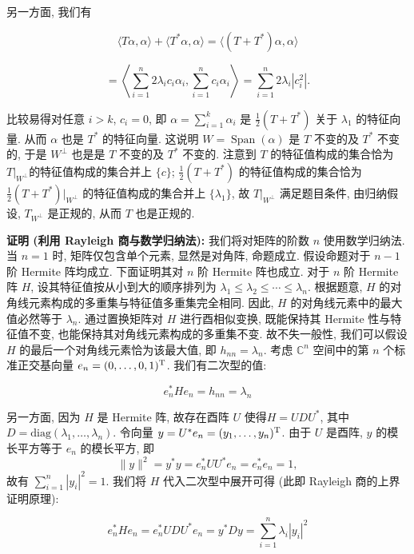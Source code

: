 \begin{enumerate}
另一方面, 我们有

\[\langle T \alpha, \alpha \rangle + \langle T ^ {*} \alpha, \alpha \rangle 
= \langle (T + T ^ {*}) \alpha, \alpha \rangle\]

\[= \left\langle \sum_{i=1}^{n} 2 \lambda_{i} c_{i} \alpha_{i}, 
\sum_{i=1}^{n} c_{i} \alpha_{i} \right\rangle 
= \sum_ {i=1}^{n} 2 \lambda_{i} |c_{i}^{2}|.\]

比较易得对任意 \(i > k\), \(c_{i} = 0\), 
即 \(\alpha = \sum_{i=1}^{k} \alpha_{i}\) 
是 \(\frac{1}{2}(T + T^{*})\) 关于 \(\lambda_{1}\) 的特征向量. 
从而 \(\alpha\) 也是 \(T^{*}\) 的特征向量. 
这说明 \(W = \operatorname{Span}(\alpha)\) 是 \(T\) 不变的及 \(T^{*}\) 不变的, 
于是 \(W^{\perp}\) 也是是 \(T\) 不变的及 \(T^{*}\) 不变的. 
注意到 \(T\) 的特征值构成的集合恰为 \(T|_{W^{\perp}}\)的特征值构成的集合并上 \(\{c\}\); 
\(\frac{1}{2}(T + T^{*})\) 的特征值构成的集合恰为 
\(\frac{1}{2}(T + T^{*})|_{W^{\perp}}\) 的特征值构成的集合并上 \(\{\lambda_{1}\}\), 
故 \(T|_{W^{\perp}}\) 满足题目条件, 
由归纳假设, \(T_{W^{\perp}}\) 是正规的, 从而 \(T\) 也是正规的.

\textbf{证明 (利用 Rayleigh 商与数学归纳法):} 
我们将对矩阵的阶数 \(n\) 使用数学归纳法. 
当 \(n = 1\) 时, 矩阵仅包含单个元素, 显然是对角阵, 命题成立. 
假设命题对于 \(n - 1\) 阶 Hermite 阵均成立. 
下面证明其对 \(n\) 阶 Hermite 阵也成立. 
对于 \(n\) 阶 Hermite 阵 \(H\), 设其特征值按从小到大的顺序排列为
\(\lambda_1 \leqslant \lambda_2 \leqslant \cdots \leqslant \lambda_n\). 
根据题意, \(H\) 的对角线元素构成的多重集与特征值多重集完全相同. 
因此, \(H\) 的对角线元素中的最大值必然等于 \(\lambda_n\). 
通过置换矩阵对 \(H\) 进行酉相似变换, 
既能保持其 Hermite 性与特征值不变, 也能保持其对角线元素构成的多重集不变. 
故不失一般性, 我们可以假设 \(H\) 的最后一个对角线元素恰为该最大值, 即 \(h_{nn} = \lambda_n\). 
考虑 \(\mathbb{C}^n\) 空间中的第 \(n\) 个标准正交基向量 \(e_n = (0, \ldots, 0, 1)^{\rm T}\). 我们有二次型的值:

\[e_{n}^{*} H e_{n} = h_{nn} = \lambda_{n}\]

另一方面, 因为 \(H\) 是 Hermite 阵, 故存在酉阵 \(U\) 使得\(H = UDU^{*}\), 
其中 \(D = \mathrm{diag}(\lambda_{1},\ldots,\lambda_{n})\). 
令向量 \(y = U^{*}e_{n} = (y_{1},\ldots,y_{n})^{\rm T}\). 
由于 \(U\) 是酉阵, \(y\) 的模长平方等于 \(e_{n}\) 的模长平方, 即
\[\| y\| ^2 = y^{*}y = e_{n}^{*}UU^{*}e_{n} = e_{n}^{*}e_{n} = 1,\]
故有 \(\displaystyle\sum_{i=1}^{n}|y_i|^2 = 1\). 
我们将 \(H\) 代入二次型中展开可得 (此即 Rayleigh 商的上界证明原理):

\[e_{n}^{*} H e_{n} = e_{n}^{*} U D U^{*} e_{n} = y^{*} D y 
= \sum_{i=1}^{n} \lambda_ {i} |y_{i}|^{2}\]


\end{enumerate}
